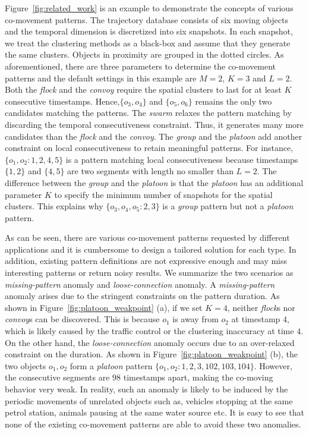 Figure~\ref{fig:related_work} is an example to demonstrate the concepts of various co-movement patterns. The trajectory database consists of six moving objects and the temporal dimension is discretized into six snapshots. In each snapshot, we treat the clustering methods as a black-box and assume that they generate the same clusters. Objects in proximity are grouped in the dotted circles. As aforementioned, there are three parameters to determine the co-movement patterns and the default settings in this example are $M=2$, $K=3$ and $L=2$. Both the \emph{flock} and the \emph{convoy} require the spatial clusters to last for at least $K$ consecutive  timestamps. Hence,$\{o_3,o_4\}$ and $\{o_5,o_6\}$  remains the only two candidates matching the patterns. The \textit{swarm} relaxes the pattern matching by discarding the temporal consecutiveness constraint. Thus, it generates many more candidates than the \textit{flock} and the \textit{convoy}. The \textit{group} and the \textit{platoon} add another constraint on local consecutiveness to retain meaningful patterns. For instance, $\{o_1,o_2:1,2,4,5\}$ is a pattern matching local consecutiveness because timestamps $\{1,2\}$ and $\{4,5\}$ are two segments with length no smaller than $L=2$. The difference between the \textit{group} and the \textit{platoon} is that the \textit{platoon} has an additional parameter $K$ to specify the minimum number of snapshots for the spatial clusters. This explains why $\{o_3,o_4,o_5:2,3\}$ is a  \textit{group} pattern but not a \textit{platoon} pattern.

As can be seen, there are various co-movement patterns requested by different 
applications and it is cumbersome to design a tailored solution for each type. 
In addition, existing pattern definitions are not expressive enough and may miss 
interesting patterns or return noisy results. We summarize 
the two scenarios as \emph{missing-pattern} anomaly
and \emph{loose-connection} anomaly.
A \emph{missing-pattern} anomaly arises due to the stringent constraints on the pattern duration.
As shown in Figure~\ref{fig:platoon_weakpoint} (a), if we set $K=4$, 
neither \emph{flock}s nor \emph{convoy}s can be discovered. This is because
$o_1$ is away from $o_2$ at timestamp $4$, which is likely caused by
the traffic control or the clustering inaccuracy at time $4$. On the other hand,
the \emph{loose-connection} anomaly occurs due to an over-relaxed constraint on 
the duration. As shown in Figure~\ref{fig:platoon_weakpoint} (b),
the two objects $o_1, o_2$ form a \emph{platoon} pattern 
$\{o_1,o_2:1,2,3,102,103,104\}$. However, the consecutive segments are $98$ timestamps apart, 
making the co-moving behavior very weak.
In reality, such an anomaly is likely to be induced by the periodic movements of unrelated objects 
such as, vehicles stopping at the same petrol station, animals pausing at the same water source etc. 
It is easy to see that none of the existing co-movement patterns are able to avoid these two anomalies.

